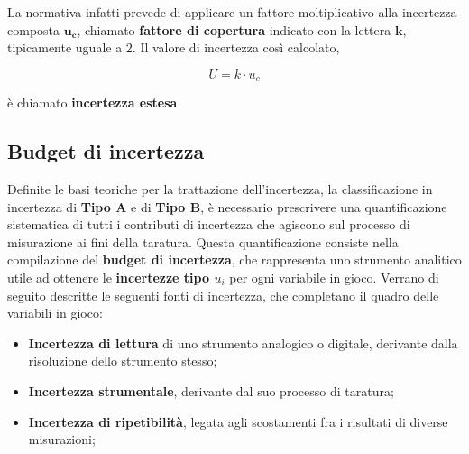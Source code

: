 \documentclass[a4paper, twoside]{article}
\begin{document}
La normativa infatti prevede di applicare un fattore moltiplicativo alla incertezza composta $\mathbf{u_c}$, chiamato \textbf{fattore di copertura} indicato con la lettera $\mathbf{k}$, tipicamente uguale a $2$. Il valore di incertezza così calcolato,

\begin{equation}
    U = k \cdot u_c
\end{equation}

 è chiamato \textbf{incertezza estesa}.

\subsection{Budget di incertezza}

Definite le basi teoriche per la trattazione dell'incertezza, la classificazione in incertezza di \textbf{Tipo A} e di \textbf{Tipo B}, è necessario prescrivere una quantificazione sistematica di tutti i contributi di incertezza che agiscono sul processo di misurazione ai fini della taratura. Questa quantificazione consiste nella compilazione del \textbf{budget di incertezza}, che rappresenta uno strumento analitico utile ad ottenere le \textbf{incertezze tipo $u_i$} per ogni variabile in gioco. Verrano di seguito descritte le seguenti fonti di incertezza, che completano il quadro delle variabili in gioco:

\begin{itemize}
    \item \textbf{Incertezza di lettura} di uno strumento analogico o digitale, derivante dalla risoluzione dello strumento stesso;
    \item \textbf{Incertezza strumentale}, derivante dal suo processo di taratura;
    \item \textbf{Incertezza di ripetibilità}, legata agli scostamenti fra i risultati di diverse misurazioni;
\end{itemize}
\end{document}
